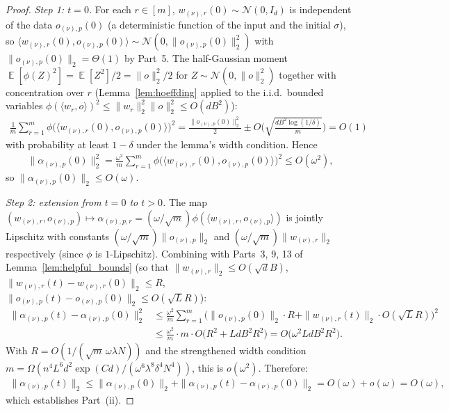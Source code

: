 \documentclass[11pt]{article}
\theoremstyle{plain}
\DeclareMathOperator*{\E}{{\mathbb{E}}}
\begin{document}
\begin{proof}
    {\it Step 1: $t=0$.} For each $r\in[m]$, $w_{(\nu),r}(0)\sim\mathcal{N}(0, I_d)$ is independent of the data $o_{(\nu),p}(0)$ (a deterministic function of the input and the initial $\sigma$), so $\langle w_{(\nu),r}(0), o_{(\nu),p}(0)\rangle\sim\mathcal{N}(0, \|o_{(\nu),p}(0)\|_2^2)$ with $\|o_{(\nu),p}(0)\|_2 = \Theta(1)$ by Part~5. The half-Gaussian moment $\E[\phi(Z)^2] = \E[Z^2]/2 = \|o\|_2^2/2$ for $Z\sim\mathcal{N}(0,\|o\|_2^2)$ together with concentration over $r$ (Lemma~\ref{lem:hoeffding} applied to the i.i.d.\ bounded variables $\phi(\langle w_r,o\rangle)^2 \le \|w_r\|_2^2 \|o\|_2^2 \le O(dB^2)$):
    \begin{align*}
        \frac{1}{m}\sum_{r=1}^m \phi\big(\langle w_{(\nu),r}(0),o_{(\nu),p}(0)\rangle\big)^2 = \frac{\|o_{(\nu),p}(0)\|_2^2}{2}\pm O\Big(\sqrt{\frac{dB^2 \log(1/\delta)}{m}}\Big) = O(1)
    \end{align*}
    with probability at least $1-\delta$ under the lemma's width condition. Hence
    \begin{align*}
        \|\alpha_{(\nu),p}(0)\|_2^2 = \frac{\omega^2}{m}\sum_{r=1}^m \phi\big(\langle w_{(\nu),r}(0),o_{(\nu),p}(0)\rangle\big)^2 \le O(\omega^2),
    \end{align*}
    so $\|\alpha_{(\nu),p}(0)\|_2 \le O(\omega)$.

    {\it Step 2: extension from $t=0$ to $t>0$.} The map $(w_{(\nu),r}, o_{(\nu),p}) \mapsto \alpha_{(\nu),p,r} = (\omega/\sqrt m)\phi(\langle w_{(\nu),r}, o_{(\nu),p}\rangle)$ is jointly Lipschitz with constants $(\omega/\sqrt m)\|o_{(\nu),p}\|_2$ and $(\omega/\sqrt m)\|w_{(\nu),r}\|_2$ respectively (since $\phi$ is $1$-Lipschitz). Combining with Parts~3, 9, 13 of Lemma~\ref{lem:helpful_bounds} (so that $\|w_{(\nu),r}\|_2 \le O(\sqrt d B)$, $\|w_{(\nu),r}(t)-w_{(\nu),r}(0)\|_2 \le R$, $\|o_{(\nu),p}(t)-o_{(\nu),p}(0)\|_2 \le O(\sqrt L R)$):
    \begin{align*}
        \|\alpha_{(\nu),p}(t) - \alpha_{(\nu),p}(0)\|_2^2 &\le \frac{\omega^2}{m}\sum_{r=1}^m\big(\|o_{(\nu),p}(0)\|_2\cdot R + \|w_{(\nu),r}(t)\|_2\cdot O(\sqrt L R)\big)^2 \\
        &\le \frac{\omega^2}{m}\cdot m\cdot O\big(R^2 + L d B^2 R^2\big) = O\big(\omega^2 L d B^2 R^2\big).
    \end{align*}
    With $R = O(1/(\sqrt m\,\omega\lambda N))$ and the strengthened width condition $m = \Omega(n^4 L^6 d^2\exp(Cd)/(\omega^6\lambda^8\delta^4 N^4))$, this is $o(\omega^2)$. Therefore:
    \begin{align*}
        \|\alpha_{(\nu),p}(t)\|_2 \le \|\alpha_{(\nu),p}(0)\|_2 + \|\alpha_{(\nu),p}(t)-\alpha_{(\nu),p}(0)\|_2 = O(\omega) + o(\omega) = O(\omega),
    \end{align*}
    which establishes Part~(ii).


\end{proof}
\end{document}
